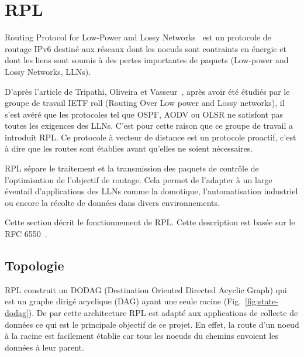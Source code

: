\newpage
\section{RPL}\label{sec:state-rpl}
\renewcommand{\rightmark}{RPL}

Routing Protocol for Low-Power and Lossy Networks~\cite{rfc:rpl} est un protocole de routage IPv6 destiné aux réseaux dont les noeuds sont contraints en énergie et dont les liens sont soumis à des pertes importantes de paquets (Low-power and Lossy Networks, LLNs).

D'après l'article de Tripathi, Oliveira et Vasseur~\cite{paper:rpl-study}, après avoir été étudiés par le groupe de travail IETF roll (Routing Over Low power and Lossy networks), il s'est avéré que les protocoles tel que OSPF, AODV ou OLSR ne satisfont pas toutes les exigences des LLNs. C'est pour cette raison que ce groupe de travail a introduit RPL.
Ce protocole à vecteur de distance est un protocole proactif, c'est à dire que les routes sont établies avant qu'elles ne soient nécessaires.

RPL sépare le traitement et la transmission des paquets de contrôle de l'optimisation de l'objectif de routage. Cela permet de l'adapter à un large éventail d'applications des LLNs comme la domotique, l'automatisation industriel ou encore la récolte de données dans divers environnements.


Cette section décrit le fonctionnement de RPL. Cette description est basée sur le RFC 6550~\cite{rfc:rpl}.


\subsection*{Topologie}
    RPL construit un DODAG (Destination Oriented Directed Acyclic Graph) qui est un graphe dirigé 
    acyclique (DAG) ayant une seule racine (Fig.~\ref{fig:state-dodag}). De par cette architecture 
    RPL est adapté aux applications de collecte de données ce qui est le principale objectif de ce 
    projet. En effet, la route d'un noeud à la racine est facilement établie car tous les noeuds du 
    chemins envoient les données à leur parent.

